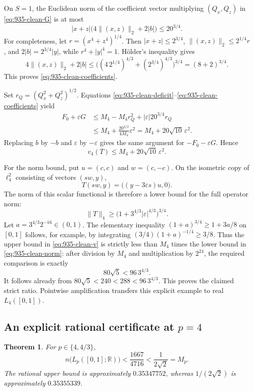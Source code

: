 \documentclass[11pt,a4paper]{article}
\newtheorem{theorem}{Theorem}[section]
\theoremstyle{remark}
\begin{document}
On $S=1$, the Euclidean norm of the coefficient vector multiplying
$(Q_x,Q_z)$ in \eqref{eq:935-clean-G} is at most
\[
 |x+z|\bigl(4\|(x,z)\|_2+2|b|\bigr)\le20^{3/4}.
 \tag{935.C4}\label{eq:935-clean-coefficients}
\]
For completeness, let $r=(x^4+z^4)^{1/4}$. Then
$|x+z|\le2^{3/4}$, $\|(x,z)\|_2\le2^{1/4}r$, and
$2|b|=2^{3/4}|y|$, while $r^4+|y|^4=1$. H\"older's inequality gives
\[
 4\|(x,z)\|_2+2|b|
 \le\bigl((4\,2^{1/4})^{4/3}+(2^{3/4})^{4/3}\bigr)^{3/4}
 =(8+2)^{3/4}.
\]
This proves \eqref{eq:935-clean-coefficients}.

Set $r_Q=(Q_x^2+Q_z^2)^{1/2}$. Equations
\eqref{eq:935-clean-deficit}--\eqref{eq:935-clean-coefficients} yield
\[
 \begin{split}
 F_0+\varepsilon G
 &\le M_4-M_4r_Q^2+|\varepsilon|20^{3/4}r_Q\\
 &\le M_4+\frac{20^{3/2}}{4M_4}\varepsilon^2
  =M_4+20\sqrt{10}\,\varepsilon^2.
 \end{split}
\]
Replacing $b$ by $-b$ and $\varepsilon$ by $-\varepsilon$ gives the same argument for
$-F_0-\varepsilon G$. Hence
\[
 v_4(T)\le M_4+20\sqrt{10}\,\varepsilon^2.
 \tag{935.C5}\label{eq:935-clean-v}
\]

For the norm bound, put $u=(c,c)$ and $w=(c,-c)$. On the isometric copy of
$\ell_4^2$ consisting of vectors $(sw,y)$,
\[
 T(sw,y)=\bigl((y-3\varepsilon s)u,0\bigr).
\]
The norm of this scalar functional is therefore a lower bound for the full
operator norm:
\[
 \|T\|_4\ge\bigl(1+3^{4/3}|\varepsilon|^{4/3}\bigr)^{3/4}.
 \tag{935.C6}\label{eq:935-clean-norm}
\]
Let $a=3^{4/3}2^{-16}\in(0,1)$. The elementary inequality
$(1+a)^{3/4}\ge1+3a/8$ on $[0,1]$ follows, for example, by integrating
$(3/4)(1+a)^{-1/4}\ge3/8$. Thus the upper bound in
\eqref{eq:935-clean-v} is strictly less than $M_4$ times the lower bound in
\eqref{eq:935-clean-norm}: after division by $M_4$ and multiplication by
$2^{24}$, the required comparison is exactly
\[
 80\sqrt5<96\,3^{4/3}.
\]
It follows already from
$80\sqrt5<240<288<96\,3^{4/3}$. This proves the claimed strict ratio.
Pointwise amplification transfers this explicit example to real
$L_4([0,1])$.


\subsection{An explicit rational certificate at \texorpdfstring{$p=4$}{p=4}}

\begin{theorem}\label{thm:935}
For $p\in\{4,4/3\}$,
\[
 n\bigl(L_p([0,1];\mathbb R)\bigr)
 <\frac{1667}{4716}
 <\frac1{2\sqrt2}=M_p.
\]
The rational upper bound is approximately $0.35347752$, whereas
$1/(2\sqrt2)$ is approximately $0.35355339$.
\end{theorem}
\end{document}
